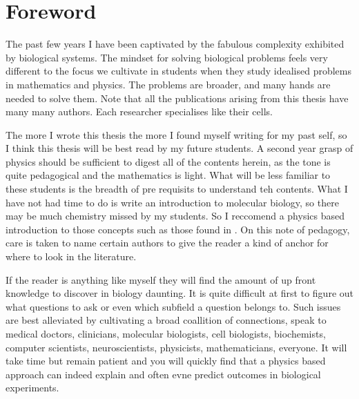 \chapter*{Foreword}
\setcounter{page}{1}
\label{chap:foreward}
\chapquote{} {}
\vspace
The past few years I have been captivated by the fabulous complexity exhibited by biological systems. The mindset for solving biological problems feels very different to the focus we cultivate in students when they study idealised problems in mathematics and physics. The problems are broader, and many hands are needed to solve them. Note that all the publications arising from this thesis have many many authors. Each researcher specialises like their cells.

The more I wrote this thesis the more I found myself writing for my past self, so I think this thesis will be best read by my future students. A second year grasp of physics should be sufficient to digest all of the contents herein, as the tone is quite pedagogical and the mathematics is light. What will be less familiar to these students is the breadth of pre requisits to understand teh contents. What I have not had time to do is write an introduction to molecular biology, so there may be much chemistry missed by my students. So I reccomend a physics based introduction to those concepts such as those found in \cite{phillips2012}. On this note of pedagogy, care is taken to name certain authors to give the reader a kind of anchor for where to look in the literature.  

If the reader is anything like myself they will find the amount of up front knowledge to discover in biology daunting. It is quite difficult at first to figure out what questions to ask or even which subfield a question belongs to. Such issues are best alleviated by cultivating a broad coallition of connections, speak to medical doctors, clinicians, molecular biologists, cell biologists, biochemists, computer scientists, neuroscientists, physicists, mathematicians, everyone. It will take time but remain patient and you will quickly find that a physics based approach can indeed explain and often evne predict outcomes in biological experiments.

